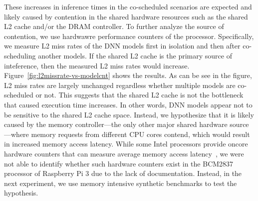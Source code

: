 These increases in inference times in the co-scheduled scenarios are
expected and likely caused by contention in the shared hardware
resources such as the shared L2 cache and/or the DRAM controller.
To further analyze the source of contention, we use hardwawre
performance counters of the processor. Specifically, we measure L2
miss rates of the DNN models first in isolation and then after
co-scheduling another models. If the shared L2 cache is the primary
source of inteference, then the measured L2 miss rates would
increase. Figure~\ref{fig:l2missrate-vs-modelcnt} shows the results.
As can be see in the figure, L2 miss rates are largely unchanged
regardless whether multiple models are co-scheduled or not. This
suggests that the shared L2 cache is not the bottleneck that caused
execution time increases. In other words, DNN models appear not to be
sensitive to the shared L2 cache space. %
Instead, we hypothesize that it is likely caused by the memory
controller---the only other major shared hardware source---where
memory requests from different CPU cores contend, which would result
in increased memory access latency. While some Intel processors
provide oncore hardware counters that can measure average memory
access latency~\cite{ye2016maracas}, we were not able to identify
whether such hardware counters exist in the BCM2837 processor of
Raspberry Pi 3 due to the lack of documentation. Instead, in the next
experiment, we use memory intensive synthetic benchmarks to test the
hypothesis.



